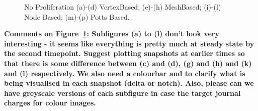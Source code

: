 \documentclass{article}
\newcommand{\highlight}[1]{{\color{red} \bf{#1}}}
\begin{document}
\begin{figure}
{\label{fig:DeltaNotchNonProlif:l}
}
\caption{No Proliferation (a)-(d) VertexBased; (e)-(h) MeshBased; (i)-(l) Node Based; (m)-(p) Potts Based.}
\label{fig:DeltaNotchNonProlif}
\end{figure}

\highlight{Comments on Figure~\ref{fig:DeltaNotchNonProlif}: 
Subfigures (a) to (l) don't look very interesting - it seems like everything is pretty much at steady state by the second timepoint. 
Suggest plotting snapshots at earlier times so that there is some difference between (c) and (d), (g) and (h) and (k) and (l) respectively. 
We also need a colourbar and to clarify what is being visualised in each snapshot (delta or notch). 
Also, please can we have greyscale versions of each subfigure in case the target journal charges for colour images.
}
\end{document}
